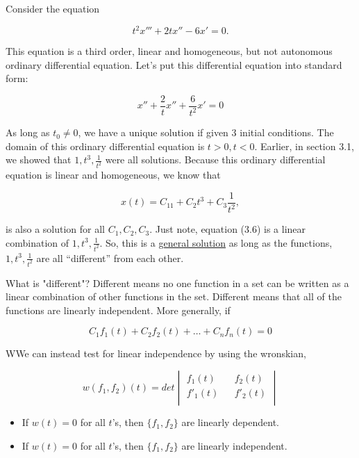   \begin{problem}
    Consider the equation

    \begin{equation}
    t^2x'''+2tx''-6x'=0.
    \end{equation}

    This equation is a third order, linear and homogeneous, but not autonomous ordinary differential equation. Let's put this differential equation into standard form:

    \begin{equation}
    x''+\frac{2}{t}x''+\frac{6}{t^2}x'=0
    \end{equation}

    As long as $t_0\neq0$, we have a unique solution if given 3 initial conditions. The domain of this ordinary differential equation is $t>0,t<0$. Earlier, in section 3.1, we showed that $1,t^3,\frac{1}{t^2}$ were all solutions. Because this ordinary differential equation is linear and homogeneous, we know that 

    \begin{equation}
    x(t)=C_11+C_2t^3+C_3\frac{1}{t^2},
    \end{equation}

    is also a solution for all $C_1,C_2,C_3$. Just note, equation (3.6) is a linear combination of $1,t^3,\frac{1}{t^2}$. So, this is a \underline{general solution} as long as the functions, $1,t^3,\frac{1}{t^2}$ are all “different” from each other.
  \end{problem}

  What is "different"? Different means no one function in a set can be written as a linear combination of other functions in the set. Different means that all of the functions are linearly independent. More generally, if 

  \begin{equation}
    C_1f_1(t)+C_2f_2(t)+\dots+C_nf_n(t)=0
  \end{equation}

  \begin{theorem}
    WWe can instead test for linear independence by using the wronskian,

    \begin{equation}
      w(f_1,f_2)(t)=det\begin{vmatrix}
        f_1(t)&&f_2(t)\\f'_1(t)&&f'_2(t)\\
      \end{vmatrix}
    \end{equation}

    \begin{itemize}
      \item If $w(t)=0$ for all $t$'s, then $\{f_1,f_2\}$ are linearly dependent.
      \item If $w(t)=0$ for all $t$'s, then $\{f_1,f_2\}$ are linearly independent.
    \end{itemize}
  \end{theorem}

